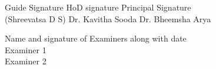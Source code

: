 \documentclass[12pt,a4paper]{report}
\newcommand{\guide}{Shreevatsa D S}
\begin{document}
\vspace{2cm}
\begin{flushleft}
Guide Signature\hspace{30mm} HoD signature \hspace{25mm} Principal Signature\\
(\guide) \hspace{25mm} Dr. Kavitha Sooda \hspace{19mm} Dr. Bheemsha Arya 
\end{flushleft}
\vspace{2cm}
\begin{flushleft}
Name and signature of Examiners along with date \\
\vspace {1cm}
Examiner 1 \\
\vspace {1cm}
Examiner 2 \\
    
\end{flushleft}


\end{document}
